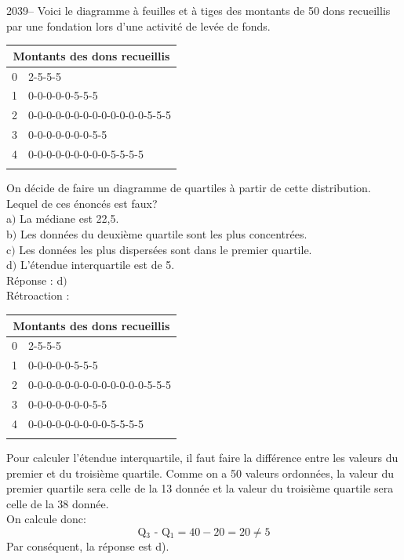 \documentclass[letterpaper, 12pt]{article}
\begin{document}
2039-- Voici le diagramme \`a feuilles et \`a tiges des montants de 50 dons recueillis par une fondation lors d'une activit\'e de lev\'ee de fonds.\\
\begin{center}
 \begin{tabular}{|c|l|}
\multicolumn{2}{c}{\bf Montants des dons recueillis} \\  \hline

0 & 2-5-5-5 \\ \hline
1 & 0-0-0-0-0-5-5-5 \\ \hline
2 & 0-0-0-0-0-0-0-0-0-0-0-0-0-5-5-5 \\ \hline
3 & 0-0-0-0-0-0-0-5-5 \\ \hline
4 & 0-0-0-0-0-0-0-0-0-5-5-5-5 \\ \hline
\multicolumn{2}{c}{}\\
\end{tabular}
\end{center}
On d\'ecide de faire un diagramme de quartiles \`a partir de cette distribution. Lequel de ces \'enonc\'es est faux?\\

a$)$ La m\'ediane est 22,5.\\
b$)$ Les donn\'ees du deuxi\`eme quartile sont les plus concentr\'ees.\\
c$)$ Les donn\'ees les plus dispers\'ees sont dans le premier quartile.\\
d$)$ L'\'etendue interquartile est de 5. \\

R\'eponse : d$)$\\

R\'etroaction :\\
\begin{center}
 \begin{tabular}{|c|l|}
\multicolumn{2}{c}{\bf Montants des dons recueillis} \\  \hline

0 & 2-5-5-5 \\ \hline
1 & 0-0-0-0-0-5-5-5 \\ \hline
2 & 0-0-0-0-0-0-0-0-0-0-0-0-0-5-5-5 \\ \hline
3 & 0-0-0-0-0-0-0-5-5 \\ \hline
4 & 0-0-0-0-0-0-0-0-0-5-5-5-5 \\ \hline
\multicolumn{2}{c}{}\\
\end{tabular}
\end{center}
Pour calculer l'\'etendue interquartile, il faut faire la diff\'erence entre les valeurs du premier et du troisi\`eme quartile. Comme on  a 50 valeurs ordonn\'ees, la valeur du premier quartile sera celle de la 13\ieme{} donn\'ee et la valeur du troisi\`eme quartile sera celle de la 38\ieme{} donn\'ee. \\
On calcule donc:\\
\begin{equation*}
 \textrm{Q$_{3}$ - Q$_{1}$}=40-20 = 20 \neq 5
\end{equation*}
Par cons\'equent, la r\'eponse est d).\\
\end{document}
